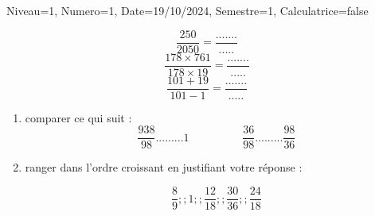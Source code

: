 \documentclass[a4paper,12pt]{article}
\begin{document}
\begin{Maquette}[DS]{Niveau=1, Numero=1, Date=19/10/2024, Semestre=1, Calculatrice=false}
\begin{exercice}
\begin{enumerate}
		\[\dfrac{250}{2050}=\dfrac{.......}{.....}\]
\[\dfrac{178\times 761}{178 \times 19}=\dfrac{.......}{.....}\]
\[\dfrac{101+19}{101-1}=\dfrac{.......}{.....}\]
		
	\end{enumerate}
\end{exercice}

\begin{exercice}
\begin{enumerate}
		\item comparer ce qui suit  :	
$$\dfrac{938}{98}......... 1 \hspace{1cm}   \hspace{1cm}
\dfrac{36}{98}.........\dfrac{98}{36}$$

\item ranger dans l'ordre croissant en justifiant votre réponse :

$$\dfrac{8}{9} ;; 1 ;; \dfrac{12}{18} ;; \dfrac{30}{36}  ;; \dfrac{24}{18}$$	

\end{enumerate}
\end{exercice}

\end{Maquette}
\end{document}
